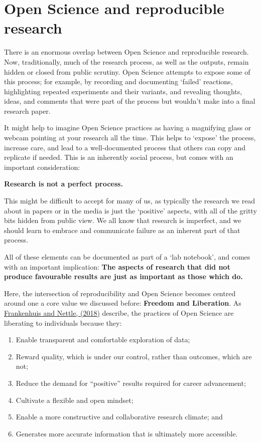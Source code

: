 \documentclass[]{book}
\begin{document}
\hypertarget{open-science-and-reproducible-research}{%
\section{Open Science and reproducible research }\label{open-science-and-reproducible-research}}

There is an enormous overlap between Open Science and reproducible research. Now, traditionally, much of the research process, as well as the outputs, remain hidden or closed from public scrutiny. Open Science attempts to expose some of this process; for example, by recording and documenting `failed' reactions, highlighting repeated experiments and their variants, and revealing thoughts, ideas, and comments that were part of the process but wouldn't make into a final research paper.

It might help to imagine Open Science practices as having a magnifying glass or webcam pointing at your research all the time. This helps to `expose' the process, increase care, and lead to a well-documented process that others can copy and replicate if needed. This is an inherently social process, but comes with an important consideration:

\textbf{Research is not a perfect process.}

This might be difficult to accept for many of us, as typically the research we read about in papers or in the media is just the `positive' aspects, with all of the gritty bits hidden from public view. We all know that research is imperfect, and we should learn to embrace and communicate failure as an inherent part of that process.

All of these elements can be documented as part of a `lab notebook', and comes with an important implication: \textbf{The aspects of research that did not produce favourable results are just as important as those which do.}

Here, the intersection of reproducibility and Open Science becomes centred around one a core value we discussed before: \textbf{Freedom and Liberation}. As \href{https://github.com/OpenScienceMOOC/Module-1-Open-Principles/blob/master/Reading\%20Material_Open\%20Principles/Frankenhuis\%20and\%20Nettle\%2C\%202018.pdf}{Frankenhuis and Nettle, (2018)} describe, the practices of Open Science are liberating to individuals because they:

\begin{enumerate}
\def\labelenumi{\arabic{enumi}.}
\item
  Enable transparent and comfortable exploration of data;
\item
  Reward quality, which is under our control, rather than outcomes, which are not;
\item
  Reduce the demand for ``positive'' results required for career advancement;
\item
  Cultivate a flexible and open mindset;
\item
  Enable a more constructive and collaborative research climate; and
\item
  Generates more accurate information that is ultimately more accessible.
\end{enumerate}
\end{document}
